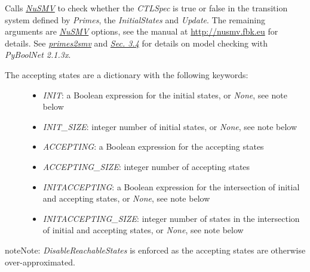 \documentclass[letterpaper,10pt,english]{sphinxmanual}
\begin{document}
\begin{fulllineitems}
\label{ModelChecking:PyBoolNet.ModelChecking.check_primes_with_acceptingstates}
Calls {\hyperref[Installation:installation-nusmv]{\emph{NuSMV}}} to check whether the \emph{CTLSpec} is true or false in the transition system defined by \emph{Primes},
the \emph{InitialStates} and \emph{Update}.
The remaining arguments are {\hyperref[Installation:installation-nusmv]{\emph{NuSMV}}} options, see the manual at \href{http://nusmv.fbk.eu}{http://nusmv.fbk.eu} for details.
See {\hyperref[ModelChecking:primes2smv]{\emph{primes2smv}}} and {\hyperref[Manual:sec-model-checking]{\emph{Sec. 3.4}}} for details on model checking with \emph{PyBoolNet 2.1.3x}.
\begin{description}
\item[{The accepting states are a dictionary with the following keywords:}] \leavevmode\begin{itemize}
\item {} 
\emph{INIT}: a Boolean expression for the initial states, or \emph{None}, see note below

\item {} 
\emph{INIT\_SIZE}: integer number of initial states, or \emph{None}, see note below

\item {} 
\emph{ACCEPTING}: a Boolean expression for the accepting states

\item {} 
\emph{ACCEPTING\_SIZE}: integer number of accepting states

\item {} 
\emph{INITACCEPTING}: a Boolean expression for the intersection of initial and accepting states, or \emph{None}, see note below

\item {} 
\emph{INITACCEPTING\_SIZE}: integer number of states in the intersection of initial and accepting states, or \emph{None}, see note below

\end{itemize}

\end{description}

\begin{notice}{note}{Note:}
\emph{DisableReachableStates} is enforced as the accepting states are otherwise over-approximated.
\end{notice}


\end{fulllineitems}
\end{document}
